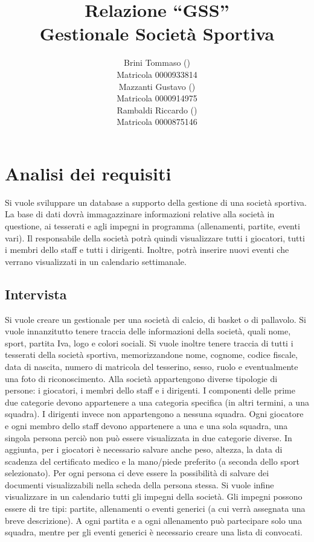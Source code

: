 \documentclass[a4paper,12pt]{report}
\title{Relazione ``GSS'' \\ Gestionale Società Sportiva}
\author{Brini Tommaso (\mail{tommaso.brini@studio.unibo.it}) \\ Matricola 0000933814 \\ Mazzanti Gustavo (\mail{gustavo.mazzanti@studio.unibo.it}) \\ Matricola 0000914975 \\ Rambaldi Riccardo (\mail{riccardo.rambaldi4@studio.unibo.it}) \\ Matricola 0000875146}
\begin{document}
\maketitle

\tableofcontents

\chapter{Analisi dei requisiti}

Si vuole sviluppare un database a supporto della gestione di una società sportiva. La base di dati dovrà immagazzinare informazioni relative alla società in questione, ai tesserati e agli impegni in programma (allenamenti, partite, eventi vari). Il responsabile della società potrà quindi visualizzare tutti i giocatori, tutti i membri dello staff e tutti i dirigenti. Inoltre, potrà inserire nuovi eventi che verrano visualizzati in un calendario settimanale.

\section{Intervista}
Si vuole creare un gestionale per una società di calcio, di basket o di pallavolo. \newline
Si vuole innanzitutto tenere traccia delle informazioni della società, quali nome, sport, partita Iva, logo e colori sociali. \newline
Si vuole inoltre tenere traccia di tutti i tesserati della società sportiva, memorizzandone nome, cognome, codice fiscale, data di nascita, numero di matricola del tesserino, sesso, ruolo e eventualmente una foto di riconoscimento. \newline
Alla società appartengono diverse tipologie di persone: i giocatori, i membri dello staff e i dirigenti. I componenti delle prime due categorie devono appartenere a una categoria specifica (in altri termini, a una squadra). I dirigenti invece non appartengono a nessuna squadra. Ogni giocatore e ogni membro dello staff devono appartenere a una e una sola squadra, una singola persona perciò non può essere visualizzata in due categorie diverse. In aggiunta, per i giocatori è necessario salvare anche peso, altezza, la data di scadenza del certificato medico e la mano/piede preferito (a seconda dello sport selezionato). \newline
Per ogni persona ci deve essere la possibilità di salvare dei documenti visualizzabili nella scheda della persona stessa. \newline
Si vuole infine visualizzare in un calendario tutti gli impegni della società. Gli impegni possono essere di tre tipi: partite, allenamenti o eventi generici (a cui verrà assegnata una breve descrizione). A ogni partita e a ogni allenamento può partecipare solo una squadra, mentre per gli eventi generici è necessario creare una lista di convocati.
\end{document}
